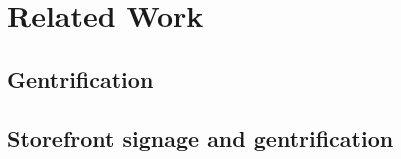 \section{Related Work}
\label{sec:related_work}


\subsection{Gentrification}





\subsection{Storefront signage and gentrification}


